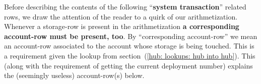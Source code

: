 \begin{center}
\end{center}
\saNote{} \label{hub: tx skip: first tx in block: why we load accounts of system smart contracts}
Before describing the contents of the following ``\textbf{system transaction}'' related rows,
we draw the attention of the reader to a quirk of our arithmetization.
Whenever a storage-row is present in the arithmetization
\textbf{a corresponding account-row must be present, too}.
By ``corresponding account-row'' we mean an account-row associated to the account whose storage is being touched.
This is a requirement given the lookup from
section~(\ref{hub: lookups: hub into hub}).
This (along with the requirement of getting the current deployment number)
explains the (seemingly useless) account-row(s) below.
\begin{description}
		
		
		
\end{description}
